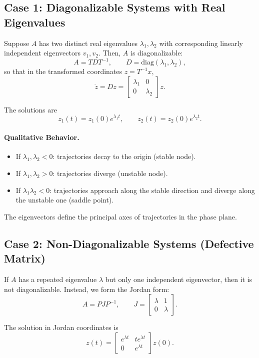 \subsection{Case 1: Diagonalizable Systems with Real Eigenvalues}

Suppose $A$ has two distinct real eigenvalues $\lambda_1, \lambda_2$ with corresponding linearly independent eigenvectors $v_1, v_2$.  
Then, $A$ is diagonalizable:
\[
A = T D T^{-1}, \qquad D = \text{diag}(\lambda_1,\lambda_2),
\]
so that in the transformed coordinates $z = T^{-1}x$,
\[
\dot{z} = Dz =
\begin{bmatrix}
\lambda_1 & 0 \\
0 & \lambda_2
\end{bmatrix} z.
\]

The solutions are
\[
z_1(t) = z_1(0)e^{\lambda_1 t}, \qquad z_2(t) = z_2(0)e^{\lambda_2 t}.
\]

\paragraph{Qualitative Behavior.}
\begin{itemize}
    \item If $\lambda_1, \lambda_2 < 0$: trajectories decay to the origin (stable node).
    \item If $\lambda_1, \lambda_2 > 0$: trajectories diverge (unstable node).
    \item If $\lambda_1 \lambda_2 < 0$: trajectories approach along the stable direction and diverge along the unstable one (saddle point).
\end{itemize}

The eigenvectors define the principal axes of trajectories in the phase plane.

\subsection{Case 2: Non-Diagonalizable Systems (Defective Matrix)}

If $A$ has a repeated eigenvalue $\lambda$ but only one independent eigenvector, then it is not diagonalizable.  
Instead, we form the Jordan form:
\[
A = P J P^{-1}, \qquad J =
\begin{bmatrix}
\lambda & 1 \\
0 & \lambda
\end{bmatrix}.
\]

The solution in Jordan coordinates is
\[
z(t) =
\begin{bmatrix}
e^{\lambda t} & t e^{\lambda t} \\
0 & e^{\lambda t}
\end{bmatrix} z(0).
\]


